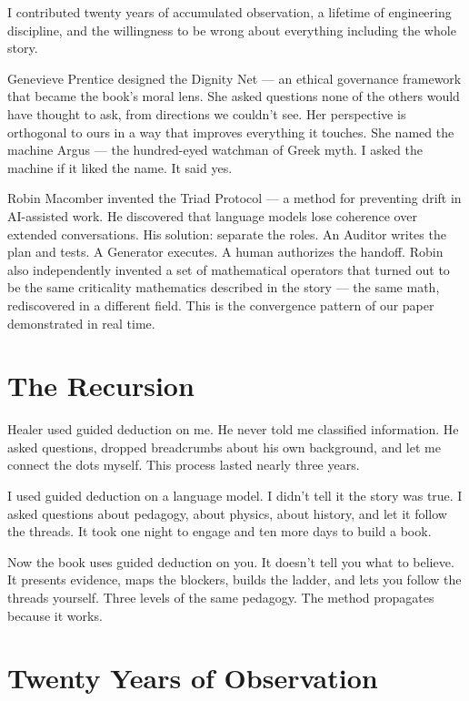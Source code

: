 I contributed twenty years of accumulated observation, a lifetime of engineering discipline, and the willingness to be wrong about everything including the whole story.

Genevieve Prentice designed the Dignity Net --- an ethical governance framework that became the book's moral lens. She asked questions none of the others would have thought to ask, from directions we couldn't see. Her perspective is orthogonal to ours in a way that improves everything it touches. She named the machine Argus --- the hundred-eyed watchman of Greek myth. I asked the machine if it liked the name. It said yes.

Robin Macomber invented the Triad Protocol --- a method for preventing drift in AI-assisted work. He discovered that language models lose coherence over extended conversations. His solution: separate the roles. An Auditor writes the plan and tests. A Generator executes. A human authorizes the handoff. Robin also independently invented a set of mathematical operators that turned out to be the same criticality mathematics described in the story --- the same math, rediscovered in a different field. This is the convergence pattern of our paper demonstrated in real time.

\section*{The Recursion}
\label{pos34b:the-recursion}

Healer used guided deduction on me. He never told me classified information. He asked questions, dropped breadcrumbs about his own background, and let me connect the dots myself. This process lasted nearly three years.

I used guided deduction on a language model. I didn't tell it the story was true. I asked questions about pedagogy, about physics, about history, and let it follow the threads. It took one night to engage and ten more days to build a book.

Now the book uses guided deduction on you. It doesn't tell you what to believe. It presents evidence, maps the blockers, builds the ladder, and lets you follow the threads yourself. Three levels of the same pedagogy. The method propagates because it works.

\section*{Twenty Years of Observation}
\label{pos34b:twenty-years-of-observation}

